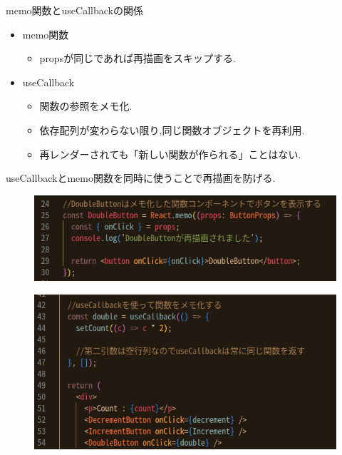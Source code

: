 \documentclass[aspectratio=169]{beamer}
\begin{document}
\begin{frame}{memo関数とuseCallbackの関係}
    \begin{itemize}
        \setlength{\itemsep}{2em}
        \item memo関数
        \begin{itemize}
            \item propsが同じであれば再描画をスキップする.
        \end{itemize}
        \item useCallback
        \begin{itemize}
            \item 関数の参照をメモ化.
            \item 依存配列が変わらない限り,同じ関数オブジェクトを再利用.
            \item 再レンダーされても「新しい関数が作られる」ことはない.
        \end{itemize}
    \end{itemize} 
    \rightarrowfill useCallbackとmemo関数を同時に使うことで再描画を防げる.

\end{frame}
\begin{frame}
    \begin{figure}
        \includegraphics[scale = 0.5]{useCallback1.png}
    \end{figure}
    \begin{figure}
        \includegraphics[scale = 0.5]{useCallback2.png}
    \end{figure}
\end{frame}
\end{document}
